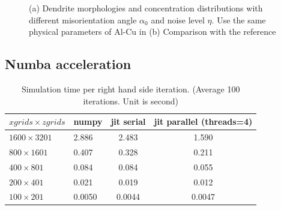 \documentclass[a4paper,12pt]{article}
\begin{document}
 \begin{figure}[!ht]
 \centering
     \hfill
     
     \caption{(a) Dendrite morphologies and concentration distributions with different misorientation angle $\alpha_0$ and noise level $\eta$. Use the same physical parameters of Al-Cu in \cite{Takaki2014}(b) Comparison with the reference \cite{Takaki2014}}
     \label{fig:Ech}
   \end{figure}
   
\subsection{Numba acceleration}
  
 \begin{table}
\centering
\caption{Simulation time per right hand side iteration. (Average 100 iterations. Unit is second) }
\begin{tabular}{l l c c }
\toprule
$x grids \times z grids$ & numpy & jit serial & jit parallel (threads=4) \\
\midrule
$1600\times3201$ & 2.886 & 2.483  & 1.590 \\
$800\times1601$ & 0.407 & 0.328  & 0.211 \\
$400\times801$ & 0.084 & 0.084  & 0.055 \\
$200\times401$ & 0.021 & 0.019  & 0.012 \\
$100\times201$ & 0.0050 & 0.0044  & 0.0047 \\
\bottomrule
\end{tabular}\label{tab:Takaki}

\end{table} 
   
   




\end{document}
